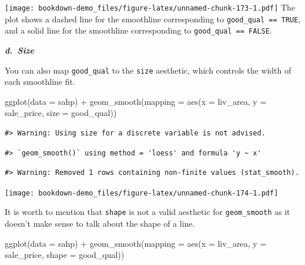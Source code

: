 \documentclass[
]{book}
\newenvironment{Shaded}{\begin{snugshade}}{\end{snugshade}}
\newcommand{\AttributeTok}[1]{\textcolor[rgb]{0.77,0.63,0.00}{#1}}
\newcommand{\FunctionTok}[1]{\textcolor[rgb]{0.00,0.00,0.00}{#1}}
\newcommand{\NormalTok}[1]{#1}
\newcommand{\SpecialCharTok}[1]{\textcolor[rgb]{0.00,0.00,0.00}{#1}}
\begin{document}
\texttt{[image: bookdown-demo\_files/figure-latex/unnamed-chunk-173-1.pdf]}
The plot shows a dashed line for the smoothline corresponding to \texttt{good\_qual\ ==\ TRUE}, and a solid line for the smoothline corresponding to \texttt{good\_qual\ ==\ FALSE}.

\textbf{\emph{d.~Size}}

You can also map \texttt{good\_qual} to the \texttt{size} aesthetic, which controls the width of each smoothline fit.

\begin{Shaded}
\begin{Highlighting}[]
\FunctionTok{ggplot}\NormalTok{(}\AttributeTok{data =}\NormalTok{ sahp) }\SpecialCharTok{+} \FunctionTok{geom\_smooth}\NormalTok{(}\AttributeTok{mapping =} \FunctionTok{aes}\NormalTok{(}\AttributeTok{x =}\NormalTok{ liv\_area, }\AttributeTok{y =}\NormalTok{ sale\_price, }\AttributeTok{size =}\NormalTok{ good\_qual))}
\end{Highlighting}
\end{Shaded}

\begin{verbatim}
#> Warning: Using size for a discrete variable is not advised.
\end{verbatim}

\begin{verbatim}
#> `geom_smooth()` using method = 'loess' and formula 'y ~ x'
\end{verbatim}

\begin{verbatim}
#> Warning: Removed 1 rows containing non-finite values (stat_smooth).
\end{verbatim}

\texttt{[image: bookdown-demo\_files/figure-latex/unnamed-chunk-174-1.pdf]}

It is worth to mention that \texttt{shape} is not a valid aesthetic for \texttt{geom\_smooth} as it doesn't make sense to talk about the shape of a line.

\begin{Shaded}
\begin{Highlighting}[]
\FunctionTok{ggplot}\NormalTok{(}\AttributeTok{data =}\NormalTok{ sahp) }\SpecialCharTok{+} \FunctionTok{geom\_smooth}\NormalTok{(}\AttributeTok{mapping =} \FunctionTok{aes}\NormalTok{(}\AttributeTok{x =}\NormalTok{ liv\_area, }\AttributeTok{y =}\NormalTok{ sale\_price, }\AttributeTok{shape =}\NormalTok{ good\_qual))}
\end{Highlighting}
\end{Shaded}
\end{document}
